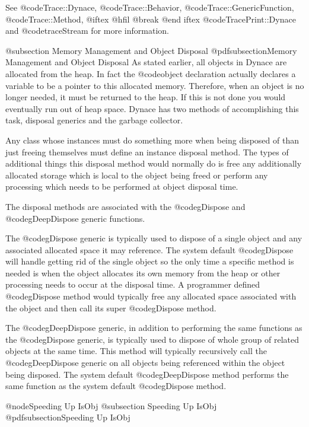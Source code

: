 See @code{Trace::Dynace}, @code{Trace::Behavior},
@code{Trace::GenericFunction}, @code{Trace::Method},
@iftex @hfil @break @end iftex
@code{TracePrint::Dynace} and @code{traceStream} for more information.




@subsection Memory Management and Object Disposal
@pdfsubsection{Memory Management and Object Disposal}
As stated earlier, all objects in Dynace are allocated from the heap.  In
fact the @code{object} declaration actually declares a variable to be a
pointer to this allocated memory.  Therefore, when an object is no
longer needed, it must be returned to the heap.  If this is not done you
would eventually run out of heap space.  Dynace has two methods of
accomplishing this task, disposal generics and the garbage collector.

Any class whose instances must do something more when
being disposed of than just freeing themselves must define an instance
disposal method.  The types of additional things this disposal method
would normally do is free any additionally allocated storage which is
local to the object being freed or perform any processing which needs
to be performed at object disposal time.

The disposal methods are associated with the @code{gDispose}
and @code{gDeepDispose} generic functions.

The @code{gDispose} generic is typically used to dispose of a single
object and any associated allocated space it may reference.  The system
default @code{gDispose} will handle getting rid of the single object so
the only time a specific method is needed is when the object
allocates its own memory from the heap or other processing needs to
occur at the disposal time.  A programmer defined @code{gDispose} method
would typically free any allocated space associated with the object and
then call its super @code{gDispose} method.

The @code{gDeepDispose} generic, in addition to performing the same
functions as the @code{gDispose} generic, is typically used to dispose
of whole group of related objects at the same time.  This method will
typically recursively call the @code{gDeepDispose} generic on all
objects being referenced within the object being disposed.  The system
default @code{gDeepDispose} method performs the same function as the
system default @code{gDispose} method.

@node{Speeding Up IsObj}
@subsection Speeding Up IsObj
@pdfsubsection{Speeding Up IsObj}

